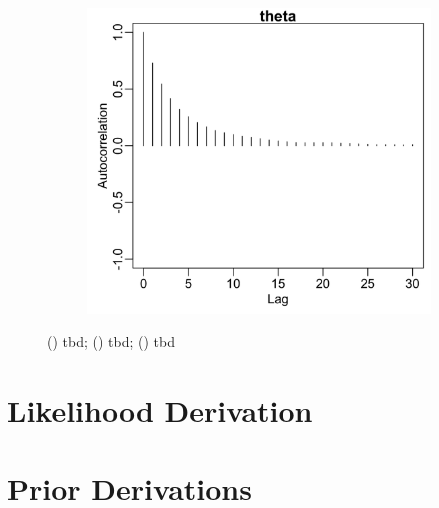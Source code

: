 \documentclass{uwstat572}
\begin{document}
\begin{figure}[H]
\begin{subfigure}[b]{0.49\textwidth}
		\includegraphics[width=\textwidth]{figures/mcmc_acf_plot_theta.png}
		\caption{}
		\label{fig:acf_theta}
	\end{subfigure}
	\caption{() tbd; () tbd; () tbd }
	\label{fig:diagnostics_theta}
\end{figure} 

\newpage
\section{Likelihood Derivation}
\label{likelihood}



\newpage
\section{Prior Derivations}
\label{Priors}
\end{document}
